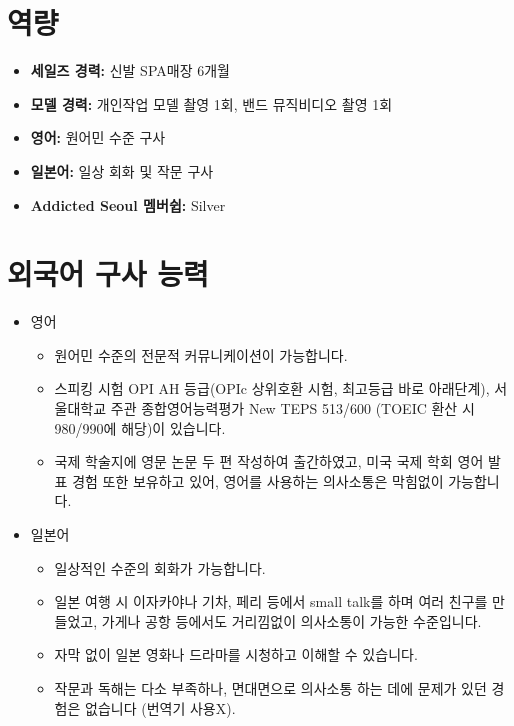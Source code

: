 
\section*{역량}
\begin{itemize}
    \item \textbf{세일즈 경력: }신발 SPA매장 6개월
    \item \textbf{모델 경력: }개인작업 모델 촬영 1회, 밴드 뮤직비디오 촬영 1회
    \item \textbf{영어: }원어민 수준 구사
    \item \textbf{일본어: }일상 회화 및 작문 구사
    \item \textbf{Addicted Seoul 멤버쉽: }Silver    
\end{itemize}

\section*{외국어 구사 능력}
\begin{itemize}
    \item 영어
          \begin{itemize}
              \item 원어민 수준의 전문적 커뮤니케이션이 가능합니다.
              \item 스피킹 시험 OPI AH 등급(OPIc 상위호환 시험, 최고등급 바로 아래단계), 서울대학교 주관 종합영어능력평가 New TEPS 513/600 (TOEIC 환산 시 980/990에 해당)이 있습니다.
              \item 국제 학술지에 영문 논문 두 편 작성하여 출간하였고, 미국 국제 학회 영어 발표 경험 또한 보유하고 있어, 영어를 사용하는 의사소통은 막힘없이 가능합니다.
          \end{itemize}
    \item 일본어
          \begin{itemize}
              \item 일상적인 수준의 회화가 가능합니다.
              \item 일본 여행 시 이자카야나 기차, 페리 등에서 small talk를 하며 여러 친구를 만들었고, 가게나 공항 등에서도 거리낌없이 의사소통이 가능한 수준입니다.
              \item 자막 없이 일본 영화나 드라마를 시청하고 이해할 수 있습니다.
              \item 작문과 독해는 다소 부족하나, 면대면으로 의사소통 하는 데에 문제가 있던 경험은 없습니다 (번역기 사용X).
          \end{itemize}
\end{itemize}

